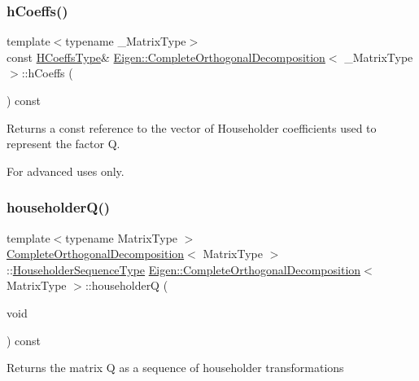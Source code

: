 \subsubsection{\texorpdfstring{hCoeffs()}{hCoeffs()}}
{\footnotesize\ttfamily template$<$typename \+\_\+\+Matrix\+Type$>$ \\
const \mbox{\hyperlink{struct_eigen_1_1internal_1_1true__type}{H\+Coeffs\+Type}}\& \mbox{\hyperlink{class_eigen_1_1_complete_orthogonal_decomposition}{Eigen\+::\+Complete\+Orthogonal\+Decomposition}}$<$ \+\_\+\+Matrix\+Type $>$\+::h\+Coeffs (\begin{DoxyParamCaption}{ }\end{DoxyParamCaption}) const\hspace{0.3cm}{\ttfamily [inline]}}

\begin{DoxyReturn}{Returns}
a const reference to the vector of Householder coefficients used to represent the factor {\ttfamily Q}.
\end{DoxyReturn}
For advanced uses only. \mbox{\label{class_eigen_1_1_complete_orthogonal_decomposition_ac95b93ddad59c6e57d06fcd4737b27e1}} 
\subsubsection{\texorpdfstring{householderQ()}{householderQ()}}
{\footnotesize\ttfamily template$<$typename Matrix\+Type $>$ \\
\mbox{\hyperlink{class_eigen_1_1_complete_orthogonal_decomposition}{Complete\+Orthogonal\+Decomposition}}$<$ Matrix\+Type $>$\+::\mbox{\hyperlink{class_eigen_1_1_householder_sequence}{Householder\+Sequence\+Type}} \mbox{\hyperlink{class_eigen_1_1_complete_orthogonal_decomposition}{Eigen\+::\+Complete\+Orthogonal\+Decomposition}}$<$ Matrix\+Type $>$\+::householderQ (\begin{DoxyParamCaption}\item[{void}]{ }\end{DoxyParamCaption}) const}

\begin{DoxyReturn}{Returns}
the matrix Q as a sequence of householder transformations 
\end{DoxyReturn}
\mbox{\label{class_eigen_1_1_complete_orthogonal_decomposition_a1f5c45f78848cfdbb96963cefbbb3274}} 
